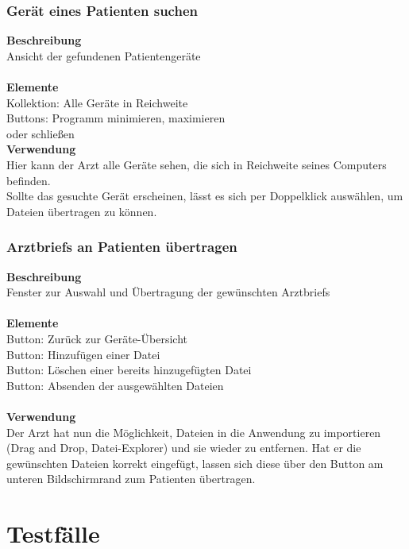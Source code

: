 \documentclass[a4paper]{scrreprt}
\begin{document}
\begin{minipage}[t][][b]{0.55\textwidth}
\subsection*{Gerät eines Patienten suchen}
\textbf{Beschreibung}\\
{Ansicht der gefundenen Patientengeräte}\\
~\\
\textbf{Elemente}\\
{Kollektion: Alle Geräte in Reichweite}\\
{Buttons: Programm minimieren, maximieren \\oder schließen}\\

\textbf{Verwendung}\\
{Hier kann der Arzt alle Geräte sehen, die sich in Reichweite seines Computers befinden.}\\
{Sollte das gesuchte Gerät erscheinen, lässt es sich per Doppelklick auswählen, um Dateien übertragen zu können.}\\


\subsection*{\glspl{Arztbrief} an Patienten übertragen}
\textbf{Beschreibung}\\
{Fenster zur Auswahl und Übertragung der gewünschten \glspl{Arztbrief}}\\
~\\
\textbf{Elemente}\\
{Button: Zurück zur Geräte-Übersicht}\\
{Button: Hinzufügen einer Datei}\\
{Button: Löschen einer bereits hinzugefügten Datei}\\
{Button: Absenden der ausgewählten Dateien}\\
~\\
\textbf{Verwendung}\\
{Der Arzt hat nun die Möglichkeit, Dateien in die Anwendung zu importieren (\gls{Drag and Drop}, Datei-Explorer) und sie wieder zu entfernen. Hat er die gewünschten Dateien korrekt eingefügt, lassen sich diese über den Button am unteren Bildschirmrand zum Patienten übertragen.}
\end{minipage}%

\chapter{Testfälle}
\end{document}
